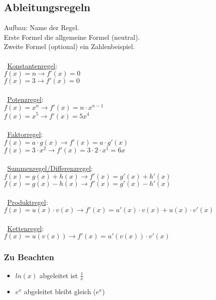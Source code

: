\subsection{Ableitungsregeln}
\label{sec:ableitungs_regeln}
Aufbau: Name der Regel. \\
Erste Formel die allgemeine Formel (neutral). \\
Zweite Formel (optional) ein Zahlenbeispiel. \\\\
\
\underline{Konstantenregel}: \\
$f(x) = n \rightarrow f'(x) = 0$ \\
$f(x) = 3 \rightarrow f'(x) = 0$ \\\\
\
\underline{Potenzregel}: \\
$f(x) = x^n \rightarrow f'(x) = n\cdot x^{n - 1}$ \\
$f(x) = x^5 \rightarrow f'(x) = 5x^{4}$ \\\\
\
\underline{Faktorregel}: \\
$f(x) = a\cdot g(x) \rightarrow f'(x) = a\cdot g'(x)$ \\
$f(x) = 3\cdot x^2 \rightarrow f'(x) = 3\cdot 2\cdot x^1 = 6x$ \\\\
\
\underline{Summenregel/Differenzregel}: \\
$f(x) = g(x) + h(x) \rightarrow f'(x) = g'(x) + h'(x)$ \\
$f(x) = g(x) - h(x) \rightarrow f'(x) = g'(x) - h'(x)$ \\\\
\
\underline{Produktregel}: \\
$f(x) = u(x) \cdot v(x) \rightarrow f'(x) = u'(x) \cdot v(x) + u(x) \cdot v'(x)$ \\\\
\
\underline{Kettenregel}: \\
$f(x) = u(v(x)) \rightarrow f'(x) = u'(v(x)) \cdot v'(x)$

\subsubsection{Zu Beachten}
\begin{itemize}
    \item $ln(x)$ abgeleitet ist $\frac{1}{x}$
    \item $e^x$ abgeleitet bleibt gleich ($e^x$)
\end{itemize}
